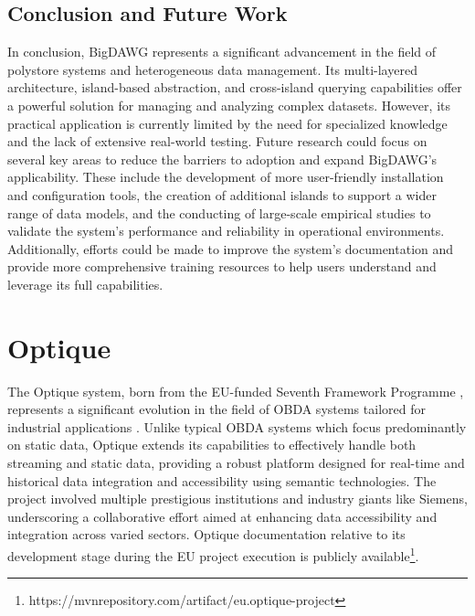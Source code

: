 \subsection{Conclusion and Future Work}
In conclusion, \ac{BigDAWG} represents a significant advancement in the field of polystore systems and heterogeneous data management. Its multi-layered architecture, island-based abstraction, and cross-island querying capabilities offer a powerful solution for managing and analyzing complex datasets. However, its practical application is currently limited by the need for specialized knowledge and the lack of extensive real-world testing.
Future research could focus on several key areas to reduce the barriers to adoption and expand \ac{BigDAWG}'s applicability. These include the development of more user-friendly installation and configuration tools, the creation of additional islands to support a wider range of data models, and the conducting of large-scale empirical studies to validate the system's performance and reliability in operational environments. Additionally, efforts could be made to improve the system's documentation and provide more comprehensive training resources to help users understand and leverage its full capabilities.

\section{Optique}
The Optique system, born from the \ac{EU}-funded Seventh Framework Programme \cite{DBLP:journals/ijtm/LytrasSP09}, represents a significant evolution in the field of \ac{OBDA} systems tailored for industrial applications \cite{DBLP:conf/semweb/KharlamovBGJLNO15}. Unlike typical \ac{OBDA} systems which focus predominantly on static data, Optique extends its capabilities to effectively handle both streaming and static data, providing a robust platform designed for real-time and historical data integration and accessibility using semantic technologies. The project involved multiple prestigious institutions and industry giants like Siemens, underscoring a collaborative effort aimed at enhancing data accessibility and integration across varied sectors. Optique documentation relative to its development stage during the \ac{EU} project execution is publicly available\footnote{https://mvnrepository.com/artifact/eu.optique-project}.

